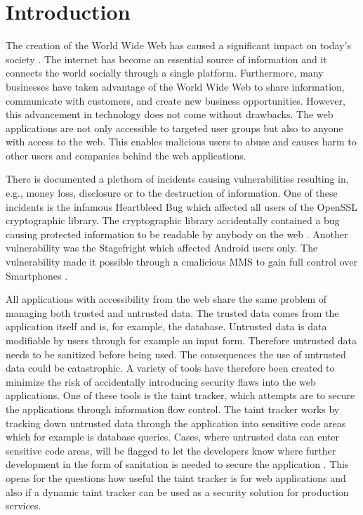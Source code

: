 \chapter{Introduction}
\label{Introduction}
The creation of the World Wide Web has caused a significant impact on today's society \parencite{www}. The internet has become an essential source of information and it connects the world socially through a single platform. Furthermore, many businesses have taken advantage of the World Wide Web to share information, communicate with customers, and create new business opportunities. However, this advancement in technology does not come without drawbacks. The web applications are not only accessible to targeted user groups but also to anyone with access to the web. This enables malicious users to abuse and causes harm to other users and companies behind the web applications.

There is documented a plethora of incidents causing vulnerabilities resulting in, e.g., money loss, disclosure or to the destruction of information. One of these incidents is the infamous Heartbleed Bug which affected all users of the OpenSSL cryptographic library. The cryptographic library accidentally contained a bug causing protected information to be readable by anybody on the web \parencite{Heartbleed}. Another vulnerability was the Stagefright which affected Android users only. The vulnerability made it possible through a cmalicious MMS to gain full control over Smartphones \parencite{2015ASvt}. 

All applications with accessibility from the web share the same problem of managing both trusted and untrusted data. The trusted data comes from the application itself and is, for example, the database. Untrusted data is data modifiable by users through for example an input form. Therefore untrusted data needs to be sanitized before being used. The consequences the use of untrusted data could be catastrophic. A variety of tools have therefore been created to minimize the risk of accidentally introducing security flaws into the web applications. One of these tools is the taint tracker, which attempts are to secure the applications through information flow control. The taint tracker works by tracking down untrusted data through the application into sensitive code areas which for example is database queries. Cases, where untrusted data can enter sensitive code areas, will be flagged to let the developers know where further development in the form of sanitation is needed to secure the application \parencite{Pan2015, Venkataramani2008}. This opens for the questions how useful the taint tracker is for web applications and also if a dynamic taint tracker can be used as a security solution for production services.



